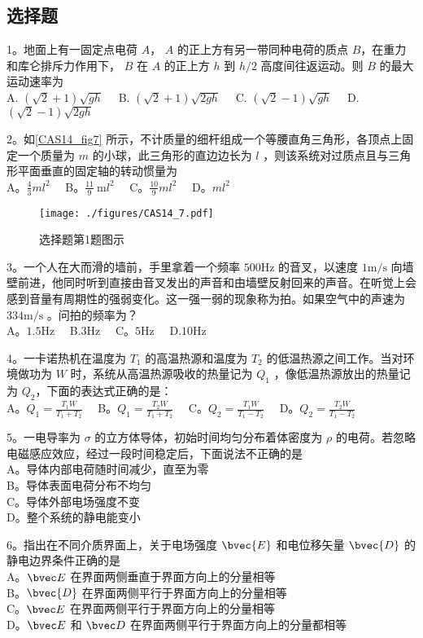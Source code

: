 
\subsection{选择题}
1。地面上有一固定点电荷 $A$， $A$ 的正上方有另一带同种电荷的质点 $B$，在重力和库仑排斥力作用下， $B$ 在 $A$ 的正上方 $h$ 到 $h/2$ 高度间往返运动。则 $B$ 的最大运动速率为\\
A. $(\sqrt{2}+1) \sqrt{g h}\quad$
B. $(\sqrt{2}+1) \sqrt{2 g h}\quad$
C. $(\sqrt{2}-1) \sqrt{g h}\quad$
D. $(\sqrt{2}-1) \sqrt{2 g h}$

2。如\autoref{CAS14_fig7} 所示，不计质量的细杆组成一个等腰直角三角形，各顶点上固定一个质量为 $m$ 的小球，此三角形的直边边长为 $l$ ，则该系统对过质点且与三角形平面垂直的固定轴的转动惯量为\\
A。$\frac{4}{3} m l^{2}\quad$
B。$\frac{11}{9} \mathrm{~m} l^{2}\quad$
C。$\frac{10}{9} m l^{2}\quad$
D。$ml^{2}$
\begin{figure}[ht]
\centering
\texttt{[image: ./figures/CAS14\_7.pdf]}
\caption{选择题第1题图示} \label{CAS14_fig7}
\end{figure}
3。一个人在大而滑的墙前，手里拿着一个频率 $500\mathrm{Hz}$ 的音叉，以速度 $1\mathrm{m/s}$ 向墙壁前进，他同时听到直接由音叉发出的声音和由墙壁反射回来的声音。在听觉上会感到音量有周期性的强弱变化。这一强一弱的现象称为拍。如果空气中的声速为 $334\mathrm{m/s}$ 。问拍的频率为？\\
A。$1.5\mathrm{Hz}\quad$ B.$3\mathrm{Hz}\quad$ C。$5\mathrm{Hz}\quad$ D.$10\mathrm{Hz}$

4。一卡诺热机在温度为 $T_1$ 的高温热源和温度为 $T_2$ 的低温热源之间工作。当对环境做功为 $W$ 时，系统从高温热源吸收的热量记为 $Q_1$ ，像低温热源放出的热量记为 $Q_2$，下面的表达式正确的是：\\

A。$Q_1=\frac{T_1W}{T_1+T_2}\quad$ B。$Q_1=\frac{T_2W}{T_1+T_2}\quad$ C。$Q_2=\frac{T_1W}{T_1-T_2}\quad$ D。$Q_2=\frac{T_2W}{T_1-T_2}$

5。一电导率为 $\sigma$ 的立方体导体，初始时间均匀分布着体密度为 $\rho$ 的电荷。若忽略电磁感应效应，经过一段时间稳定后，下面说法不正确的是\\
A。导体内部电荷随时间减少，直至为零\\
B。导体表面电荷分布不均匀\\
C。导体外部电场强度不变\\
D。整个系统的静电能变小

6。指出在不同介质界面上，关于电场强度 $\bvec{E}$ 和电位移矢量 $\bvec{D}$ 的静电边界条件正确的是\\
A。$\bvec E$ 在界面两侧垂直于界面方向上的分量相等\\
B。$\bvec{D}$ 在界面两侧平行于界面方向上的分量相等\\
C。$\bvec E$ 在界面两侧平行于界面方向上的分量相等\\
D。$\bvec E$ 和 $\bvec D$ 在界面两侧平行于界面方向上的分量都相等

